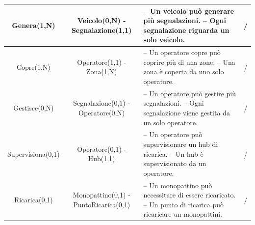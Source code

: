 \documentclass[11pt,a4paper]{article}
\begin{document}
\begin{tabularx}{\textwidth}{| C{0.95} | C{0.90} | L{1.30} | C{0.75} |}
    Genera(1,N)                                                    & Veicolo(0,N) - Segnalazione(1,1)               &
    -- Un veicolo può generare più segnalazioni. \newline
    -- Ogni segnalazione riguarda un solo veicolo.                 & /                                                                                          \\ \hline

    Copre(1,N)                                                     & Operatore(1,1) - Zona(1,N)                     &
    -- Un operatore copre può coprire più di una zone. \newline
    -- Una zona è coperta da uno solo operatore.         & /                                                                                          \\ \hline

    Gestisce(0,N)                                                  & Segnalazione(0,1) - \newline Operatore(0,N)    &
    -- Un operatore può gestire più segnalazioni. \newline
    -- Ogni segnalazione viene gestita da un solo operatore.       &
    /                                                                                                                                                           \\ \hline

    Supervisiona(0,1)                                              & Operatore(0,1) - \newline Hub(1,1)             &
    -- Un operatore può supervisionare un hub di ricarica. \newline
    -- Un hub è supervisionato da un operatore.                    &
    /                                                                                                                                                           \\ \hline

    Ricarica(0,1)                                                  & Monopattino(0,1) - \newline PuntoRicarica(0,1) &
    -- Un monopattino può necessitare di essere ricaricato. \newline
    -- Un punto di ricarica può ricaricare un monopattini.        &
    /                                                                                                                                                           \\ \hline


\end{tabularx}
\end{document}
